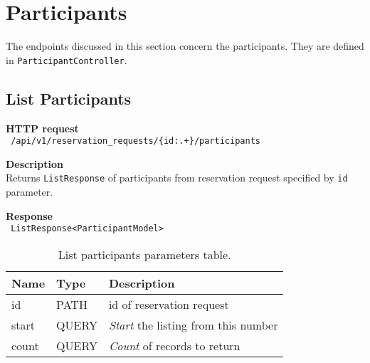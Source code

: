 \section{Participants}
The endpoints discussed in this section concern the participants. They are defined in \texttt{ParticipantController}.

\subsection{List Participants}
\begin{description}
    \item \textbf{HTTP request}\\
        \texttt{\text{[GET]} /api/v1/reservation\_requests/\{id:.+\}/participants}
    \item \textbf{Description}\\
        Returns \texttt{ListResponse} of participants from reservation request specified by \texttt{id} parameter.
    \item \textbf{Response}\\
        \texttt{\text{[200 OK]} ListResponse<ParticipantModel>}
\end{description}
\begin{table}[ht!]
    \begin{tabularx}{\textwidth}{llX}
        \toprule
        Name & Type & Description \\
        \midrule
        id & PATH & id of reservation request \\
        start & QUERY & \emph{Start} the listing from this number \\  
        count & QUERY & \emph{Count} of records to return \\
        \bottomrule
        \end{tabularx}
    \caption{List participants parameters table.}
\end{table}

